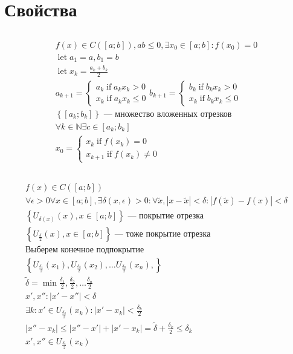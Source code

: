 \documentclass{article}
\DeclareMathOperator*{\Let}{let}
\DeclareMathOperator*{\If}{if}
\begin{document}
\section{Свойства}

\subsection{}

\begin{gather*}
	f(x) \in C([a; b]), ab \le 0, \exists x_0 \in [a; b] : f(x_0) = 0 \\
	\Let a_1 = a, b_1 = b \\
	\Let x_k = \frac{a_k + b_k}{2} \\
	a_{k + 1} = \begin{cases}
		a_k \If a_k x_k > 0 \\
		x_k \If a_k x_k \le 0
	\end{cases}
	b_{k + 1} = \begin{cases}
		b_k \If b_k x_k > 0 \\
		x_k \If b_k x_k \le 0
	\end{cases} \\
	\left\{ [a_k; b_k] \right\} \text{ --- множество вложенных отрезков} \\
	\forall k \in \mathbb{N} \exists c \in [a_k; b_k] \\
	x_0 = \begin{cases}
		x_k \If f(x_k) = 0 \\
		x_{k + 1} \If f(x_k) \ne 0
	\end{cases}
\end{gather*}

\subsection{}

\begin{gather*}
	f(x) \in C([a; b]) \\
	\forall \epsilon > 0 \forall x \in [a; b], \exists \delta(x, \epsilon) > 0 :
	\forall \tilde{x}, |x - \tilde{x}| < \delta :
	|f(\tilde{x}) - f(x)| < \delta \\
	\left\{ U_{\delta(x)}(x), x \in [a; b] \right\} \text{ --- покрытие отрезка} \\
	\left\{ U_\frac{\delta}{2}(x), x \in [a; b] \right\} \text{ --- тоже покрытие отрезка} \\
	\text{Выберем конечное подпокрытие} \\
	\left\{ U_\frac{\delta_1}{2}(x_1), U_\frac{\delta_2}{2}(x_2), \dots U_\frac{\delta_n}{2}(x_n),  \right\} \\
	\tilde{\delta} = \min {\frac{\delta_1}{2}, \frac{\delta_2}{2}, \dots \frac{\delta_n}{2}} \\
	x', x'' : |x' - x''| < \delta \\
	\exists k : x' \in U_\frac{\delta_k}{2}(x_k) : |x' - x_k| < \frac{\delta_k}{2} \\
	|x'' - x_k| \le |x'' - x'| + |x' - x_k| = \tilde{\delta} + \frac{\delta_k}{2} \le \delta_k \\
	x', x'' \in U_\frac{\delta_k}{2}(x_k)
\end{gather*}
\end{document}
